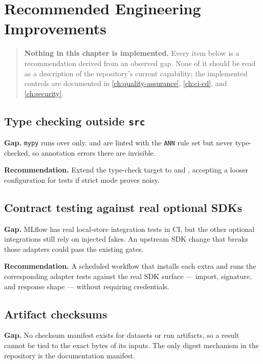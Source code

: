 
\chapter{Recommended Engineering Improvements}
\label{ch:improvements}

\begin{quote}
\textbf{Nothing in this chapter is implemented.} Every item below is a
recommendation derived from an observed gap. None of it should be read as a
description of the repository's current capability; the implemented controls
are documented in \cref{ch:quality-assurance}, \cref{ch:ci-cd}, and
\cref{ch:security}.
\end{quote}

\section{Type checking outside \texttt{src}}

\textbf{Gap.} \texttt{mypy} runs over  only.  and
 are linted with the \texttt{ANN} rule set but never
type-checked, so annotation errors there are invisible.

\textbf{Recommendation.} Extend the type-check target to  and
, accepting a looser configuration for tests if strict mode
proves noisy.

\section{Contract testing against real optional SDKs}

\textbf{Gap.} MLflow has real local-store integration tests in CI, but the
other optional integrations still rely on injected fakes. An upstream SDK
change that breaks those adapters could pass the existing gates.

\textbf{Recommendation.} A scheduled workflow that installs each extra and runs
the corresponding adapter tests against the real SDK surface --- import,
signature, and response shape --- without requiring credentials.

\section{Artifact checksums}

\textbf{Gap.} No checksum manifest exists for datasets or run artifacts, so a
result cannot be tied to the exact bytes of its inputs. The only digest
mechanism in the repository is the documentation manifest.

